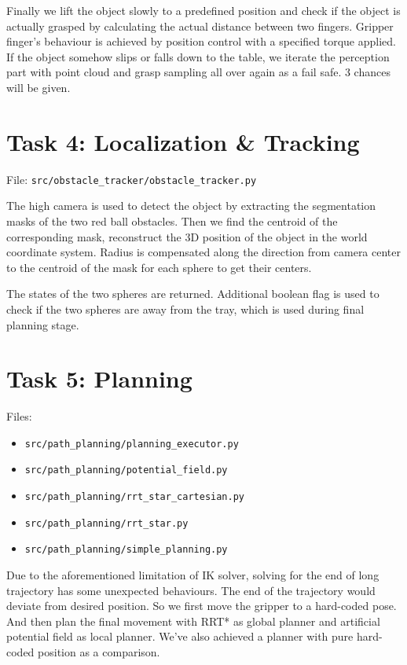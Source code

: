 \documentclass[
	english,
	accentcolor=11d,%
	type=intern,
	marginpar=false,
    logofile=media/PEARLTUDA.png
	]{tudapub}
\let\code\texttt
\begin{document}
Finally we lift the object slowly to a predefined position and check if the object is actually grasped by calculating the actual distance between two fingers. Gripper finger's behaviour is achieved by position control with a specified torque applied. If the object somehow slips or falls down to the table, we iterate the perception part with point cloud and grasp sampling all over again as a fail safe. 3 chances will be given.

\section{Task 4: Localization \& Tracking}
File: \code{src/obstacle\_tracker/obstacle\_tracker.py}

The high camera is used to detect the object by extracting the segmentation masks of the two red ball obstacles. Then we find the centroid of the corresponding mask, reconstruct the 3D position of the object in the world coordinate system. Radius is compensated along the direction from camera center to the centroid of the mask for each sphere to get their centers.

The states of the two spheres are returned. Additional boolean flag is used to check if the two spheres are away from the tray, which is used during final planning stage.

\section{Task 5: Planning}
Files: 
\begin{itemize}
\item \code{src/path\_planning/planning\_executor.py}
\item \code{src/path\_planning/potential\_field.py}
\item \code{src/path\_planning/rrt\_star\_cartesian.py}
\item \code{src/path\_planning/rrt\_star.py}
\item \code{src/path\_planning/simple\_planning.py}
\end{itemize}

Due to the aforementioned limitation of IK solver, solving for the end of long trajectory has some unexpected behaviours. The end of the trajectory would deviate from desired position. So we first move the gripper to a hard-coded pose. And then plan the final movement with RRT* as global planner and artificial potential field as local planner. We've also achieved a planner with pure hard-coded position as a comparison.
\end{document}
